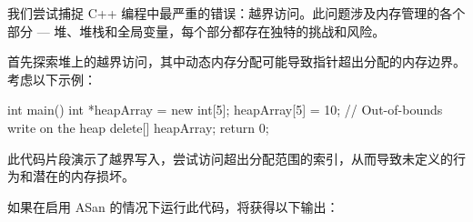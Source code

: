 
我们尝试捕捉 C++ 编程中最严重的错误：越界访问。此问题涉及内存管理的各个部分 --- 堆、堆栈和全局变量，每个部分都存在独特的挑战和风险。


首先探索堆上的越界访问，其中动态内存分配可能导致指针超出分配的内存边界。考虑以下示例：

\begin{cpp}
int main() {
    int *heapArray = new int[5];
    heapArray[5] = 10; // Out-of-bounds write on the heap
    delete[] heapArray;
    return 0;
}
\end{cpp}

此代码片段演示了越界写入，尝试访问超出分配范围的索引，从而导致未定义的行为和潜在的内存损坏。

如果在启用 ASan 的情况下运行此代码，将获得以下输出：

